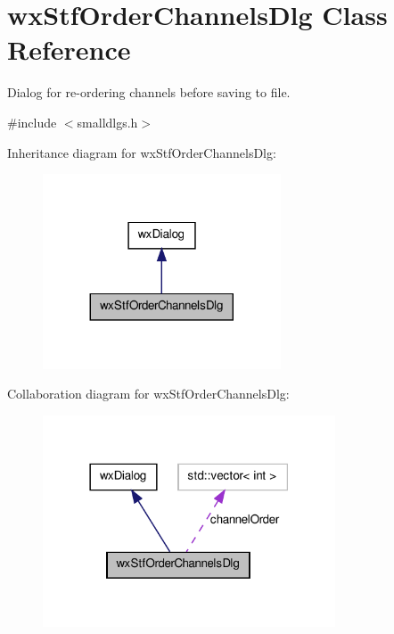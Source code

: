 \hypertarget{classwxStfOrderChannelsDlg}{
\section{wxStfOrderChannelsDlg Class Reference}
\label{classwxStfOrderChannelsDlg}
}


Dialog for re-\/ordering channels before saving to file.  




{\ttfamily \#include $<$smalldlgs.h$>$}



Inheritance diagram for wxStfOrderChannelsDlg:
\nopagebreak
\begin{figure}[H]
\begin{center}
\leavevmode
\includegraphics[width=200pt]{classwxStfOrderChannelsDlg__inherit__graph}
\end{center}
\end{figure}


Collaboration diagram for wxStfOrderChannelsDlg:
\nopagebreak
\begin{figure}[H]
\begin{center}
\leavevmode
\includegraphics[width=246pt]{classwxStfOrderChannelsDlg__coll__graph}
\end{center}
\end{figure}

